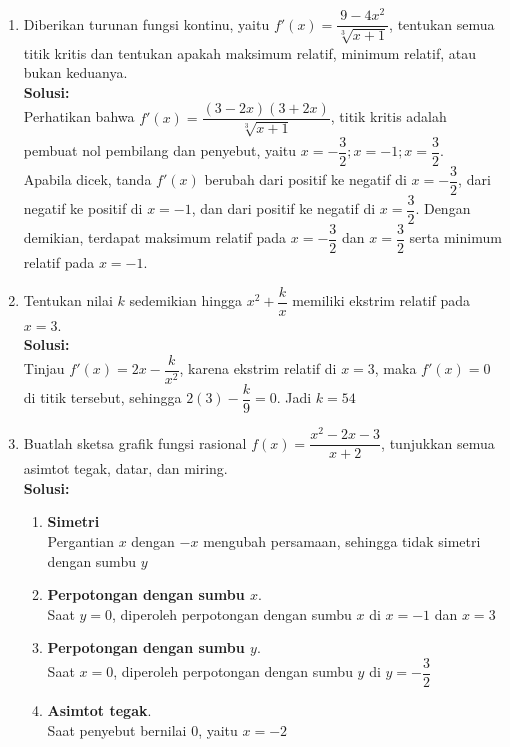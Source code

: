 \documentclass{article}
\begin{document}
\newcommand\nextarrow[1]{
        \global\advance\arrowcount-1
        \ifx\relax#1\relax\else \xrightarrow{#1}\fi
        \ifnum\arrowcount=0
                \end{matrix}
        \else
                \\
                \expandafter\nextarrow
        \fi
}
\newpage
{}
\begin{enumerate}
	\item Diberikan turunan fungsi kontinu, yaitu $f'(x)=\dfrac{9-4x^2}{\sqrt[3]{x+1}}$, tentukan semua titik kritis dan tentukan apakah maksimum relatif, minimum relatif, atau bukan keduanya. 
	\\[0.1 cm] \textbf{Solusi:}
	\\ Perhatikan bahwa $f'(x)=\dfrac{(3-2x)(3+2x)}{\sqrt[3]{x+1}}$, titik kritis adalah pembuat nol pembilang dan penyebut, yaitu $x=-\dfrac{3}{2};x=-1;x=\dfrac{3}{2}$.\\ Apabila dicek, tanda $f'(x)$ berubah dari positif ke negatif di $x=-\dfrac{3}{2}$, dari negatif ke positif di $x=-1$, dan dari positif ke negatif di $x=\dfrac{3}{2}$. Dengan demikian, terdapat maksimum relatif pada $x=-\dfrac{3}{2}$ dan $x=\dfrac{3}{2}$ serta minimum relatif pada $x=-1$. 
	\item Tentukan nilai $k$ sedemikian hingga $x^2+\dfrac{k}{x}$ memiliki ekstrim relatif pada $x=3$.
\\	\textbf{Solusi:}\\
	Tinjau $f'(x)=2x-\dfrac{k}{x^2}$, karena ekstrim relatif di $x=3$, maka $f'(x)=0$ di titik tersebut, sehingga
	$ 2(3)-\dfrac{k}{9} = 0$. Jadi $k=54$
	\item Buatlah sketsa grafik fungsi rasional $f(x)=\dfrac{x^2-2x-3}{x+2}$, tunjukkan semua asimtot tegak, datar, dan miring.
	\\[0.1 cm] \textbf{Solusi:}
	\begin{enumerate}
		\item \textbf{Simetri} 
		\\ Pergantian $x$ dengan $-x$ mengubah persamaan, sehingga tidak simetri dengan sumbu $y$
		\item \textbf{Perpotongan dengan sumbu $x$}. \\ Saat $y=0$, diperoleh perpotongan dengan sumbu $x$ di $x=-1$ dan $x=3$
		\item \textbf{Perpotongan dengan sumbu $y$}. \\Saat $x=0$, diperoleh perpotongan dengan sumbu $y$ di $y=-\dfrac{3}{2}$
		\item \textbf{Asimtot tegak}. \\Saat penyebut bernilai $0$, yaitu $x=-2$

\end{enumerate}
\end{enumerate}
\end{document}

